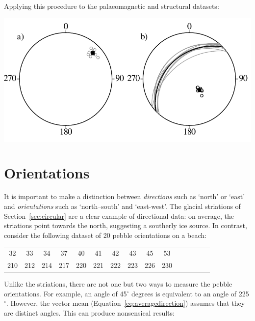 Applying this procedure to the palaeomagnetic and structural datasets:

\noindent\begin{minipage}[t][][b]{.6\textwidth}
\includegraphics[width=\textwidth]{../figures/sphericalmean.pdf}
\end{minipage}
\begin{minipage}[t][][t]{.4\textwidth}
  \label{fig:sphericalmean}
\end{minipage}

\section{Orientations}\label{sec:orientations}

It is important to make a distinction between \emph{directions} such
as `north' or `east' and \emph{orientations} such as `north--south'
and `east-west'. The glacial striations of Section~\ref{sec:circular}
are a clear example of directional data: on average, the striations
point towards the north, suggesting a southerly ice source.  In
contrast, consider the following dataset of 20 pebble orientations on
a beach:

\begin{center}
\begin{tabular}{ccccccccccccccc}
  32 & 33 & 34 & 37 & 40 & 41 & 42 & 43 & 45 & 53 \\
  210 & 212 & 214 & 217 & 220 & 221 & 222 & 223 & 226 & 230
\end{tabular}
\end{center}

Unlike the striations, there are not one but two ways to measure the
pebble orientations. For example, an angle of 45$^\circ$ degrees is
equivalent to an angle of 225$^\circ$. However, the vector mean
(Equation~\ref{eq:averagedirection}) assumes that they are distinct
angles. This can produce nonsensical results:

